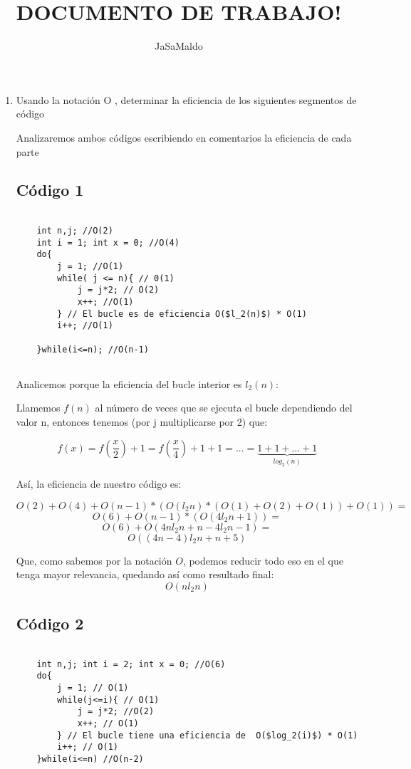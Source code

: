 \documentclass[11pt]{article}
\title{\textbf{DOCUMENTO DE TRABAJO!}}
\author{JaSaMaldo}
\date{}
\begin{document}
\maketitle

\begin{enumerate}
\item  Usando la notación O
, determinar la eficiencia de los siguientes segmentos de
código

Analizaremos ambos códigos escribiendo en comentarios la eficiencia de cada parte

\subsection*{Código 1}

\begin{verbatim}

	int n,j; //O(2)
	int i = 1; int x = 0; //O(4)
	do{
		j = 1; //O(1)
		while( j <= n){ // 0(1) 
			j = j*2; // O(2)
			x++; //O(1)
		} // El bucle es de eficiencia O($l_2(n)$) * O(1)
		i++; //O(1)
		
	}while(i<=n); //O(n-1)
	
\end{verbatim}

Analicemos porque la eficiencia del bucle interior es $l_2(n)$:

Llamemos $f(n)$ al número de veces que se ejecuta el bucle dependiendo del valor n,  entonces tenemos (por j multiplicarse por 2) que:

\[ f(x) = f\left(\frac{x}{2}\right) + 1 = f\left(\frac{x}{4}\right) + 1 + 1 = ... = \underbrace{1 + 1 + ... + 1}_{log_2 (n)} \]

Así, la eficiencia de nuestro código es:

\[
O(2) + O(4) + O(n-1)*(O(l_2n)*(O(1)+O(2)+O(1))+O(1)) = 
\]
\[
O(6) + O(n-1)*(O(4l_2n + 1)) = 
\]
\[
O(6) + O(4nl_2n + n - 4l_2n - 1 ) = 
\]
\[
O((4n - 4)l_2n + n + 5)
\]

Que, como sabemos por la notación $O$, podemos reducir todo eso en el que tenga mayor relevancia, quedando así como resultado final: 
\[O(nl_2n)\]
\subsection*{Código 2}

\begin{verbatim}
	
	int n,j; int i = 2; int x = 0; //O(6)
	do{
		j = 1; // O(1)
		while(j<=i){ // O(1)
			j = j*2; //O(2) 
			x++; // O(1)
		} // El bucle tiene una eficiencia de  O($log_2(i)$) * O(1)
		i++; // O(1)
	}while(i<=n) //O(n-2)
\end{verbatim}


\end{enumerate}
\end{document}
